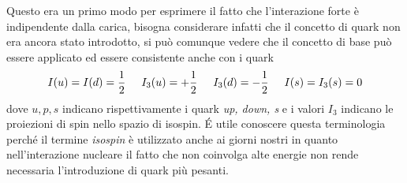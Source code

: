 Questo era un primo modo per esprimere il fatto che l'interazione forte è indipendente dalla carica, bisogna considerare infatti che il concetto di quark non era ancora stato introdotto, si può comunque vedere che il concetto di base può essere applicato ed essere consistente anche con i quark
\begin{equation}
I(u)=I(d)=\frac{1}{2}\hspace{0.5cm} I_3(u)=+\frac{1}{2}\hspace{0.5cm}I_3(d)=-\frac{1}{2}\hspace{0.5cm}I(s)=I_3(s)=0
\end{equation}
dove $u, p, s$ indicano rispettivamente i quark \emph{up, down, s} e i valori $I_3$ indicano le proiezioni di spin nello spazio di isospin.
\'E utile conoscere questa terminologia perché il termine \emph{isospin} è utilizzato anche ai giorni nostri in quanto nell'interazione nucleare il fatto che non coinvolga alte energie non rende necessaria l'introduzione di quark più pesanti.

